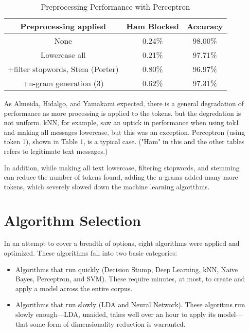 \documentclass[10pt,journal,compsoc]{IEEEtran}
\begin{document}
\begin{table}[!t]
\renewcommand{\arraystretch}{1.3}
\caption{Preprocessing Performance with Perceptron}
\label{Table 1}
\centering
\begin{tabular}{|c|c|c|}
\hline
Preprocessing applied & Ham Blocked & Accuracy \\ \hline
None & 0.24\% & 98.00\% \\ \hline
Lowercase all & 0.21\% & 97.71\% \\ \hline
+filter stopwords, Stem (Porter) & 0.80\% & 96.97\% \\ \hline
+n-gram generation (3) & 0.62\% & 97.31\% \\ \hline

\end{tabular}
\end{table}

As Almeida, Hidalgo, and Yamakami expected, \cite{Paper} there is a general degradation of performance as more processing is applied to the tokens, but the degredation is not uniform. kNN, for example, saw an uptick in performance when using tok1 and making all messages lowercase, but this was an exception. Perceptron (using token 1), shown in Table 1, is a typical case. ("Ham" in this and the other tables refers to legitimate text messages.)

In addition, while making all text lowercase, filtering stopwords, and stemming can reduce the number of tokens found, adding the n-grams added many more tokens, which severely slowed down the machine learning algorithms.

\section{Algorithm Selection}

In an attempt to cover a breadth of options, eight algorithms were applied and optimized. These algorithms fall into two basic categories:

\begin{itemize}
    \item Algorithms that run quickly (Decision Stump, Deep Learning, kNN, Naive Bayes, Perceptron, and SVM). These require minutes, at most, to create and apply a model across the entire corpus.
    \item Algorithms that run slowly (LDA and Neural Network). These algoritms run slowly enough---LDA, unaided, takes well over an hour to apply its model---that some form of dimensionality reduction is warranted.
\end{itemize}
\end{document}
